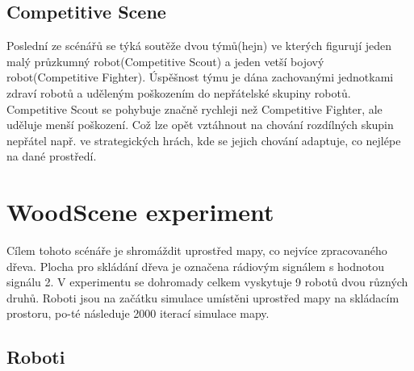 \subsection{Competitive Scene}
Poslední ze scénářů se týká soutěže dvou týmů(hejn) ve kterých figurují jeden malý průzkumný robot(Competitive Scout) a jeden vetší bojový robot(Competitive Fighter). Úspěšnost týmu je dána zachovanými jednotkami zdraví robotů a uděleným poškozením do nepřátelské skupiny robotů. Competitive Scout se pohybuje značně rychleji než Competitive Fighter, ale uděluje menší poškození. Což lze opět vztáhnout na chování rozdílných skupin nepřátel např. ve strategických hrách, kde se jejich chování adaptuje, co nejlépe na dané prostředí. 

\section{WoodScene experiment}
Cílem tohoto scénáře je shromáždit uprostřed mapy, co nejvíce zpracovaného dřeva. Plocha pro skládání dřeva je označena rádiovým signálem s hodnotou signálu 2. V experimentu se dohromady celkem vyskytuje 9 robotů dvou různých druhů. Roboti jsou na začátku simulace umístěni uprostřed mapy na skládacím prostoru, po-té následuje 2000 iterací simulace mapy. 

\subsection{Roboti}

